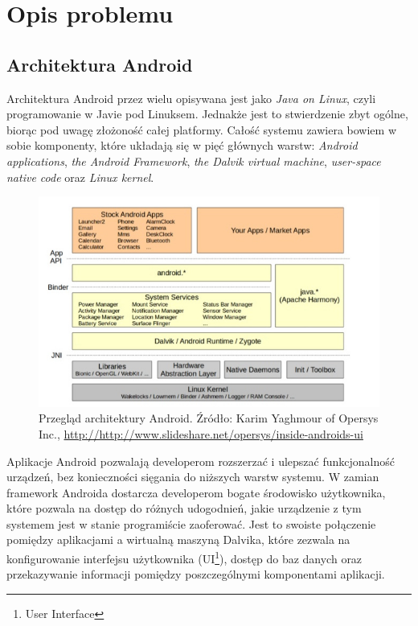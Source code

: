 \chapter{Opis problemu}

\section{Architektura Android}
Architektura Android przez wielu opisywana jest jako \textit{Java on Linux}, czyli programowanie w Javie pod Linuksem. Jednakże jest to stwierdzenie zbyt ogólne, biorąc pod uwagę złożoność całej platformy. Całość systemu zawiera bowiem w sobie komponenty, które układają się w pięć głównych warstw: \textit{Android applications}, \textit{the Android Framework}, \textit{the Dalvik virtual machine}, \textit{user-space native code} oraz \textit{Linux kernel}\cite{bib:hacker:handbook}.

\begin{figure}[!htb]
    \centering
    \includegraphics[width=15cm]{imgs/ch3_android_architecture_1.jpg}
    \caption
{Przegląd architektury Android. Źródło: Karim Yaghmour of Opersys Inc., \url{http://http://www.slideshare.net/opersys/inside-androids-ui}}
    \label{fig:ch3_android_architecture_1}
\end{figure} 

Aplikacje Android pozwalają developerom rozszerzać i ulepszać funkcjonalność urządzeń, bez konieczności sięgania do niższych warstw systemu. W zamian framework Androida dostarcza developerom bogate środowisko użytkownika, które pozwala na dostęp do różnych udogodnień, jakie urządzenie z tym systemem jest w stanie programiście zaoferować. Jest to swoiste połączenie pomiędzy aplikacjami a wirtualną maszyną Dalvika, które zezwala na konfigurowanie interfejsu użytkownika (UI\footnote{User Interface}), dostęp do baz danych oraz przekazywanie informacji pomiędzy poszczególnymi komponentami aplikacji.

